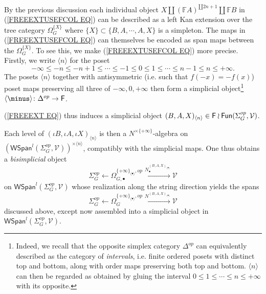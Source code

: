 \documentclass[a4paper,10pt]{article}%
\begin{document}
By the previous discussion each individual object 
$X \amalg (\mathbb{F}A)^{\amalg 2n+1} \amalg \mathbb{F}B$ in
(\ref{FREEEXTUSEFCOL EQ})
can be described as a left Kan extension over the tree category 
$\Omega_{G}^{\{X\}}$ where 
$\{X\} \subset \{B,A,\cdots,A,X\}$ is a simpleton.
The maps in (\ref{FREEEXTUSEFCOL EQ}) can themselves be encoded as span maps between the $\Omega_{G}^{\{X\}}$.
To see this, we make (\ref{FREEEXTUSEFCOL EQ}) more precise.
Firstly, we write $\langle n \rangle$ for the poset
\[
	- \infty \leq -n \leq -n+1 \leq
\cdots
	\leq -1 \leq 0 \leq 1 \leq
\cdots
	\leq n-1 \leq n \leq + \infty.
\]
The posets $\langle n \rangle$ together with antisymmetric (i.e. such that $f(-x)=-f(x)$) poset maps preserving all three of $-\infty, 0, +\infty$
then form a simplicial object\footnote{Indeed, we recall that the opposite simplex category $\Delta^{op}$ can equivalently described as the category of \textit{intervals}, i.e. finite ordered posets with distinct top and bottom, along with order maps preserving both top and bottom.
$\langle n \rangle$ can then be regarded as obtained by gluing the interval $0\leq 1 \leq \cdots \leq n \leq + \infty$ with its opposite.}
$\langle \minus \rangle \colon \Delta^{op} \to \Fin$.


(\ref{FREEEXT EQ}) thus induces a simplicial object
$(B,A,X)_{\langle n \rangle} \in \mathsf{F} \wr \mathsf{Fun}(\Sigma_G^{op}, \mathcal{V})$.

Each level of $(\iota B,\iota A,\iota X)_{\langle n \rangle}$ is then a $N^{\times \{+\infty\}}$-algebra on 
$\left(
\mathsf{WSpan}^l(\Sigma_G^{op},\mathcal{V})
\right)^{\times \langle n \rangle}$, compatibly with the simplicial maps. One thus obtains a \textit{bisimplicial} object 
\[
	\Sigma_G^{op} \leftarrow 
	\Omega_{G,\bullet}^{\{+\infty\}_{\langle \bullet \rangle},op}
	\xrightarrow{N_{\bullet}^{(B,A,X)_{\langle \bullet \rangle}}}
	\mathcal{V}
\]
on $\mathsf{WSpan}^l(\Sigma_G^{op},\mathcal{V})$
whose realization along the string direction yields the
spans 
\begin{equation}\label{PARTREALSPAN EQ}
	\Sigma_G^{op} \leftarrow 
	\Omega_{G}^{\{+\infty\}_{\langle \bullet \rangle},op}
	\xrightarrow{N^{(B,A,X)_{\langle \bullet \rangle}}}
	\mathcal{V}
\end{equation}
discussed above, except now assembled into a simplicial object in $\mathsf{WSpan}^l(\Sigma_G^{op},\mathcal{V})$.
\end{document}
